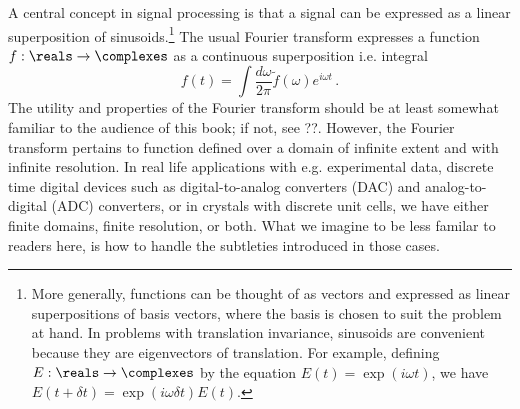A central concept in signal processing is that a signal can be expressed as a linear superposition of sinusoids.\footnote{More generally, functions can be thought of as vectors and expressed as linear superpositions of basis vectors, where the basis is chosen to suit the problem at hand. In problems with translation invariance, sinusoids are convenient because they are eigenvectors of translation. For example, defining $E: \reals \rightarrow \complexes$ by the equation $E(t) = \exp(i \omega t)$, we have $E(t + \delta t) = \exp(i \omega \delta t) E(t)$.}
The usual Fourier transform expresses a function $f: \reals \rightarrow \complexes$ as a continuous superposition i.e. integral
\begin{equation}
  f(t) = \int \frac{d \omega}{2\pi} \tilde{f}(\omega) e^{i \omega t} \, .
\end{equation}
The utility and properties of the Fourier transform should be at least somewhat familiar to the audience of this book; if not, see ??.
However, the Fourier transform pertains to function defined over a domain of infinite extent and with infinite resolution.
In real life applications with e.g. experimental data, discrete time digital devices such as digital-to-analog converters (DAC) and analog-to-digital (ADC) converters, or in crystals with discrete unit cells, we have either finite domains, finite resolution, or both.
What we imagine to be less familar to readers here, is how to handle the subtleties introduced in those cases.

